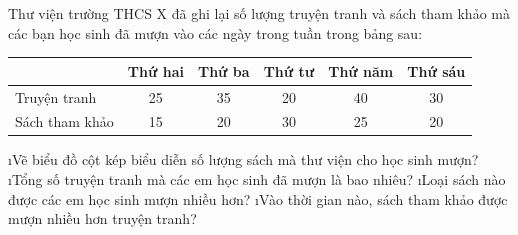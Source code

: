 \begin{vd}
	Thư viện trường THCS X đã ghi lại số lượng truyện tranh và sách tham khảo mà các bạn học sinh đã mượn vào các ngày trong tuần trong bảng sau:
	\begin{center}
		\begin{tabular}{|l|c|c|c|c|c|}
			\hline
			&Thứ hai&	Thứ ba&	Thứ tư&	Thứ năm&	Thứ sáu\\
			\hline
			Truyện tranh& 	25&	35&	20&	40&	30\\
			\hline
			Sách tham khảo&	15&	20&	30&	25&	20\\
			\hline
		\end{tabular}
	\end{center}
	\begin{enumerate}[a),leftmargin=*]
		\i Vẽ biểu đồ cột kép biểu diễn số lượng sách mà thư viện cho học sinh mượn?
		\i Tổng số truyện tranh mà các em học sinh đã mượn là bao nhiêu? 
		\i Loại sách nào được các em học sinh mượn nhiều hơn?
		\i Vào thời gian nào, sách tham khảo được mượn nhiều hơn truyện tranh?
	\end{enumerate}
\end{vd}
